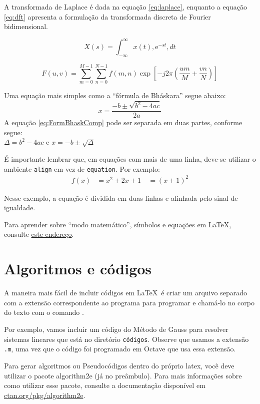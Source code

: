 A transformada de Laplace é dada na equação \ref{eq:laplace}, enquanto a equação \ref{eq:dft} apresenta a formulação da transformada discreta de Fourier bidimensional.

\begin{equation}
X(s) = \int_{-\infty}^{\infty} x(t) , \text{e}^{-st} , dt
\label{eq:laplace}
\end{equation}

\begin{equation}
F(u, v) = \sum_{m = 0}^{M - 1} \sum_{n = 0}^{N - 1} f(m, n) \exp \left[ -j 2 \pi \left( \frac{u m}{M} + \frac{v n}{N} \right) \right]
\label{eq:dft}
\end{equation}

Uma equação mais simples como a ``fórmula de Bháskara'' segue abaixo:
\begin{equation}
    x=\frac{-b\pm\sqrt{b^2-4ac}}{2a}\label{eq:FormBhaskComp}
\end{equation}
A equação \eqref{eq:FormBhaskComp} pode ser separada em duas partes, conforme segue:\\
$\Delta=b^2-4ac$ e $x=-b\pm\sqrt{\Delta}$

É importante lembrar que, em equações com mais de uma linha, deve-se utilizar o ambiente \texttt{align} em vez de \texttt{equation}. Por exemplo:
\begin{align}
f(x) &= x^2 + 2x + 1 \
&= (x+1)^2
\end{align}

Nesse exemplo, a equação é dividida em duas linhas e alinhada pelo sinal de igualdade. 

Para aprender sobre ``modo matemático'', símbolos e equações em \LaTeX, consulte \href{https://pt.overleaf.com/learn/latex/Mathematical_expressions}{este endereço}.


\section{Algoritmos e códigos}
A maneira mais fácil de incluir códigos em \LaTeX~é criar um arquivo separado com a extensão correspondente ao programa para programar e  chamá-lo no corpo do texto com o comando \verb||.

Por exemplo, vamos incluir um código do Método de Gauss para resolver sistemas lineares que está no diretório \verb|códigos|. Observe que usamos a extensão \verb|.m|, uma vez que o código foi programado em Octave que usa essa extensão.


Para gerar algoritmos ou Pseudocódigos dentro do próprio latex, você deve utilizar o pacote {\ttfamily algorithm2e} (já no preâmbulo). Para mais informações sobre como utilizar esse pacote, consulte a documentação disponível em \href{https://www.ctan.org/pkg/algorithm2e}{ctan.org/pkg/algorithm2e}.

